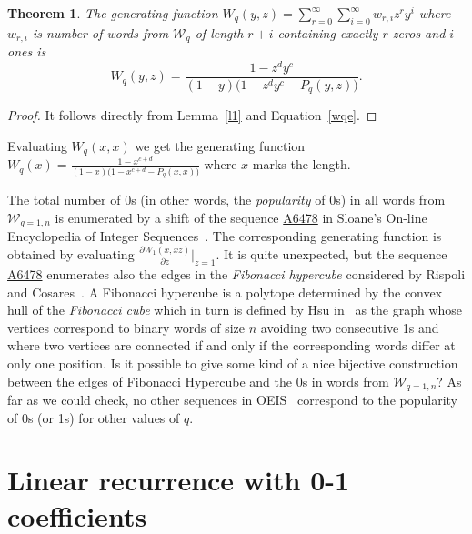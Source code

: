 \documentclass[a4paper,12pt]{article}
\newtheorem{theorem}{Theorem}
\theoremstyle{definition}
\newcommand\oeis[1]{\href{https://oeis.org/#1}{#1}}
\newcommand{\W}{\mathcal{W}}
\begin{document}
\bigskip


\begin{theorem}
  The generating function $W_q(y, z) = \sum_{r=0}^\infty
  \sum_{i=0}^\infty w_{r,i} z^r y^i$ where $w_{r,i}$ is number of
  words from $\W_q$ of length $r+i$ containing exactly $r$ zeros and
  $i$ ones is
  $$W_q(y,z) = \frac{1 - z^dy^c}{(1-y)\big(1-z^dy^c - P_q(y,z) \big)}.$$
  \label{wqt}
\end{theorem}

\begin{proof}
  It follows directly from Lemma~\ref{l1} and Equation~\eqref{wqe}.
\end{proof}

Evaluating $W_q(x,x)$ we get the generating function $W_q(x) =
\frac{1 - x^{c+d}}{(1-x)\big(1-x^{c+d} - P_q(x,x) \big)}$
where $x$ marks the length.

The total number of 0s (in other words, the {\em popularity} of 0s) in
all words from $\W_{q=1,n}$ is enumerated by a shift of the sequence
\oeis{A6478} in Sloane's On-line Encyclopedia of Integer
Sequences~\cite{oeis}.  The corresponding generating function is
obtained by evaluating $\frac{\partial W_1(x,xz)}{\partial z}\vert_{z
  = 1}$.  It is quite unexpected, but the sequence \oeis{A6478}
enumerates also the edges in the {\em Fibonacci hypercube} considered
by Rispoli and Cosares~\cite{ris-cos}. A Fibonacci hypercube is a
polytope determined by the convex hull of the {\em Fibonacci cube}
which in turn is defined by Hsu in~\cite{hsu} as the graph whose
vertices correspond to binary words of size $n$ avoiding two
consecutive 1s and where two vertices are connected if and only if the
corresponding words differ at only one position.  Is it possible to
give some kind of a nice bijective construction between the edges of
Fibonacci Hypercube and the 0s in words from $\W_{q=1,n}$?  As far as
we could check, no other
sequences in OEIS~\cite{oeis} correspond to the popularity of 0s (or
1s) for other values of $q$.



\section{Linear recurrence with 0-1 coefficients}
\end{document}
